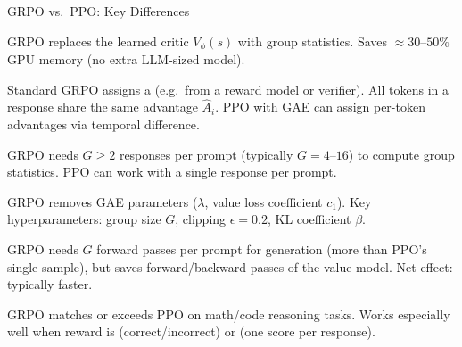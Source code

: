 \begin{frame}{GRPO vs.\ PPO: Key Differences}
  \begin{description}\largesep
    \item[No Value Model] GRPO replaces the learned critic $V_\phi(s)$ with group statistics.
      Saves ${\approx}30$--$50\%$ GPU memory (no extra LLM-sized model).

    \item[Per-Sequence Reward] Standard GRPO assigns a  (e.g.\ from a reward model or verifier).
      All tokens in a response share the same advantage $\hat{A}_i$.
      PPO with GAE can assign per-token advantages via temporal difference.

    \item[Multiple Samples Required] GRPO needs $G \geq 2$ responses per prompt (typically $G = 4$--$16$) to compute group statistics.
      PPO can work with a single response per prompt.

    \item[Simpler Hyperparameters] GRPO removes GAE parameters ($\lambda$, value loss coefficient $c_1$).
      Key hyperparameters: group size $G$, clipping $\epsilon = 0.2$, KL coefficient $\beta$.

    \item[Trade-off] GRPO needs $G$ forward passes per prompt for generation (more than PPO's single sample), but saves forward/backward passes of the value model. Net effect: typically faster.

    \item[Empirically] GRPO matches or exceeds PPO on math/code reasoning tasks.
      Works especially well when reward is  (correct/incorrect) or  (one score per response).
  \end{description}
\end{frame}

